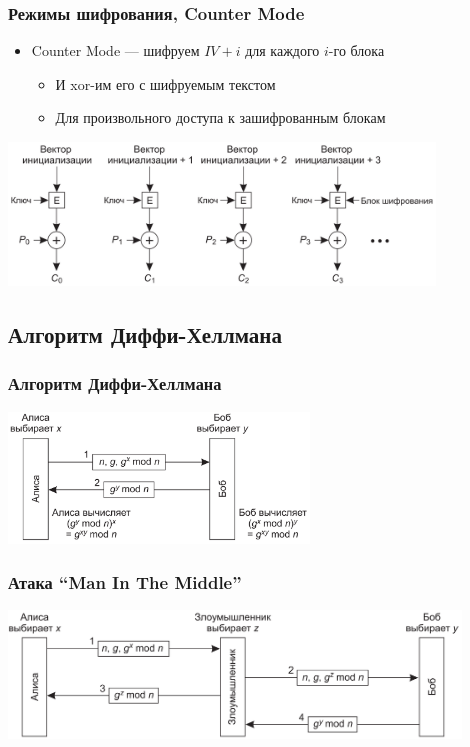 \documentclass{../../slides-style}
\begin{document}
    \begin{frame}
        \frametitle{Режимы шифрования, Counter Mode}
        \begin{itemize}
            \item Counter Mode --- шифруем $IV + i$ для каждого $i$-го блока
            \begin{itemize}
                \item И xor-им его с шифруемым текстом
                \item Для произвольного доступа к зашифрованным блокам
            \end{itemize}
        \end{itemize}
        \begin{center}
            \includegraphics[width=0.85\textwidth]{cm.png}
        \end{center}
    \end{frame}

    \subsection{Алгоритм Диффи-Хеллмана}

    \begin{frame}
        \frametitle{Алгоритм Диффи-Хеллмана}
        \begin{center}
            \includegraphics[width=0.6\textwidth]{diffieHellman.png}
        \end{center}
    \end{frame}

    \begin{frame}
        \frametitle{Атака ``Man In The Middle''}
        \begin{center}
            \includegraphics[width=0.9\textwidth]{diffieHellmanMitm.png}
        \end{center}
    \end{frame}
\end{document}
